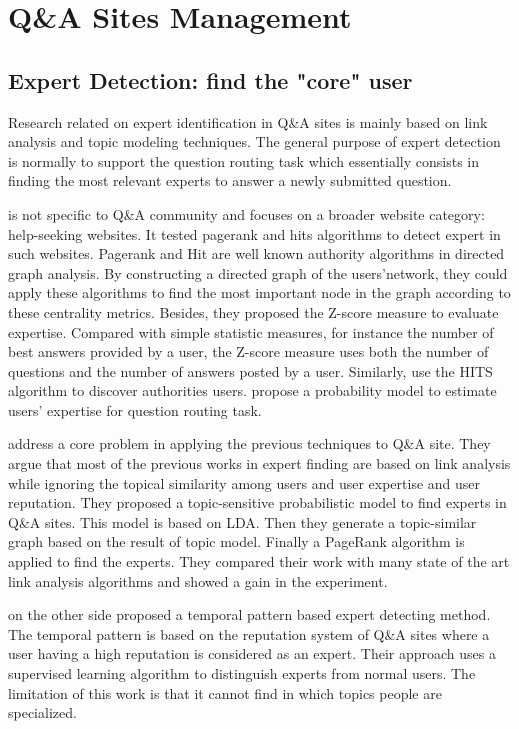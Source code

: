 \section{Q\&A Sites Management}


\subsection{Expert Detection: find the "core" user}
Research related on expert identification in Q\&A sites is mainly based on link analysis and topic modeling techniques. The general purpose of expert detection is normally to support the question routing task which essentially consists in finding the most relevant experts to answer a newly submitted question. 

\cite{zhang2007expertise} is not specific to Q\&A community and focuses on a broader website category: help-seeking websites. It tested pagerank and hits algorithms to detect expert in such websites. Pagerank and Hit are well known authority algorithms in directed graph analysis. By constructing a directed graph of the users'network, they could apply these algorithms to find the most important node in the graph according to these centrality metrics. Besides, they proposed the Z-score measure to evaluate expertise. Compared with simple statistic measures, for instance the number of best answers provided by a user, the Z-score measure uses both the number of questions and the number of answers posted by a user. Similarly, \cite{jurczyk2007discovering} use the HITS algorithm to discover authorities users. \cite{li2010routing} propose a probability model to estimate users' expertise for question routing task. 

\cite{chp2Zhou:2012:TPM:2396761.2398493} address a core problem in applying the previous techniques to Q\&A site. They argue that most of the previous works in expert finding are based on link analysis while ignoring the topical similarity among users and user expertise and user reputation. They proposed a topic-sensitive probabilistic model to find experts in Q\&A sites. This model is based on LDA. Then they generate a topic-similar graph based on the result of topic model. Finally a PageRank algorithm is applied to find the experts. They compared their work with many state of the art link analysis algorithms and showed a gain in the experiment.

\cite{chp2Pal:2010:Expert:evolution} on the other side proposed a temporal pattern based expert detecting method. The temporal pattern is based on the reputation system of Q\&A sites where a user having a high reputation is considered as an expert. Their approach uses a supervised learning algorithm to distinguish experts from normal users. The limitation of this work is that it cannot find in which topics people are specialized.

